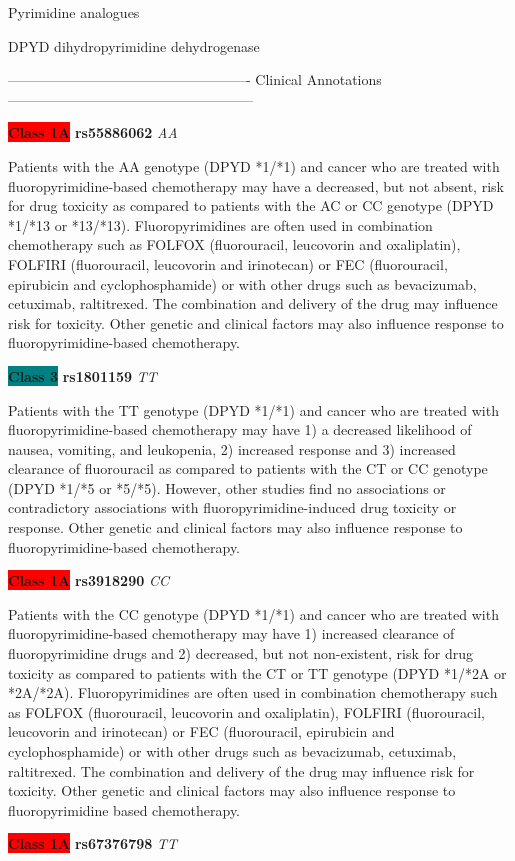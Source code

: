\documentclass{resume} %
\begin{document}
\begin{rSection}{ Pyrimidine analogues }
\begin{rSubsection}{ DPYD }{ dihydropyrimidine dehydrogenase }{}{}
\item[] ---------------------------------------------------- Clinical Annotations -----------------------------------------------------\newline
\item \textbf{\colorbox{red} {Class 1A}} \textbf{ rs55886062 } \textit{ AA }
\item[] Patients with the AA genotype (DPYD *1/*1) and cancer who are treated with fluoropyrimidine-based chemotherapy may have a decreased, but not absent, risk for drug toxicity as compared to patients with the AC or CC genotype (DPYD *1/*13 or *13/*13). Fluoropyrimidines are often used in combination chemotherapy such as FOLFOX (fluorouracil, leucovorin and oxaliplatin), FOLFIRI (fluorouracil, leucovorin and irinotecan) or FEC (fluorouracil, epirubicin and cyclophosphamide) or with other drugs such as bevacizumab, cetuximab, raltitrexed. The combination and delivery of the drug may influence risk for toxicity. Other genetic and clinical factors may also influence response to fluoropyrimidine-based chemotherapy.\item \textbf{\colorbox{teal} {Class 3}} \textbf{ rs1801159 } \textit{ TT }
\item[] Patients with the TT genotype (DPYD *1/*1) and cancer who are treated with fluoropyrimidine-based chemotherapy may have 1) a decreased likelihood of nausea, vomiting, and leukopenia, 2) increased response and 3) increased clearance of fluorouracil as compared to patients with the CT or CC genotype (DPYD *1/*5 or *5/*5). However, other studies find no associations or contradictory associations with fluoropyrimidine-induced drug toxicity or response. Other genetic and clinical factors may also influence response to fluoropyrimidine-based chemotherapy.\item \textbf{\colorbox{red} {Class 1A}} \textbf{ rs3918290 } \textit{ CC }
\item[] Patients with the CC genotype (DPYD *1/*1) and cancer who are treated with fluoropyrimidine-based chemotherapy may have 1) increased clearance of fluoropyrimidine drugs and 2) decreased, but not non-existent, risk for drug toxicity as compared to patients with the CT or TT genotype (DPYD *1/*2A or *2A/*2A). Fluoropyrimidines are often used in combination chemotherapy such as FOLFOX (fluorouracil, leucovorin and oxaliplatin), FOLFIRI (fluorouracil,  leucovorin and irinotecan) or FEC (fluorouracil, epirubicin and cyclophosphamide) or with other drugs such as bevacizumab, cetuximab, raltitrexed. The combination and delivery of the drug may influence risk for toxicity. Other genetic and clinical factors may also influence response to fluoropyrimidine based chemotherapy.\item \textbf{\colorbox{red} {Class 1A}} \textbf{ rs67376798 } \textit{ TT }

\end{rSubsection}
\end{rSection}
\end{document}
